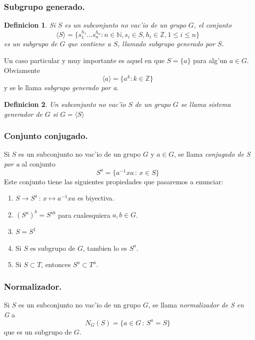 \documentclass[a4paper,openright,12pt]{report}
\numberwithin{equation}{section} %
\newtheorem{definicion}{Definicion}[section] %
\begin{document}
\subsubsection{Subgrupo generado.}
\begin{definicion}
Si $S$ es un subconjunto no vac'io de un grupo $G$, el conjunto
\[
\langle S \rangle = \{s_{1}^{h_{1}}\ldots s_{n}^{h_{n}}:n\in \mathbb{N},s_{i}\in S,h_{i}\in \mathbb{Z}, 1 \le i \le n \}
\]
es un subgrupo de $G$ que contiene a $S$, llamado subgrupo generado por $S$.
\end{definicion}
Un caso particular y muy importante es aquel en que $S=\{a\}$ para alg'un $a \in G$. Obviamente
\[
\langle a \rangle = \{a^{k}:k \in \mathbb{Z} \}
\]
y se le llama \textit{subgrupo generado por a}.
\begin{definicion}
Un subconjunto no vac'io $S$ de un grupo $G$ se llama sistema generador de $G$ si $G=\langle S \rangle$
\end{definicion}
\subsubsection{Conjunto conjugado.}
Si $S$ es un subconjunto no vac'io de un grupo $G$ y $a \in G$, se llama \textit{conjugado de S por a} al conjunto
\[
S^{a}=\{a^{-1}xa\,:\,x\in S  \}
\]
Este conjunto tiene las siguientes propiedades que pasaremos a enunciar:
\begin{enumerate}
\item $S \rightarrow S^{a} \,:\, x\mapsto a^{-1}xa$ es biyectiva.
\item $(S^{a})^{b}=S^{ab}$ para cualesquiera $a,b \in G$.
\item $S=S^{1}$
\item Si $S$ es subgrupo de $G$, tambien lo es $S^{a}$.
\item Si $S \subset T$, entonces $S^{a} \subset T^{a}$.
\end{enumerate}
\subsubsection{Normalizador.}
Si $S$ es un subconjunto no vac'io de un grupo $G$, se llama \textit{normalizador de S en G} a 
\[
N_{G}(S) = \{a \in G \,:\, S^{a}=S \}
\]
que es un subgrupo de $G$.
\end{document}
